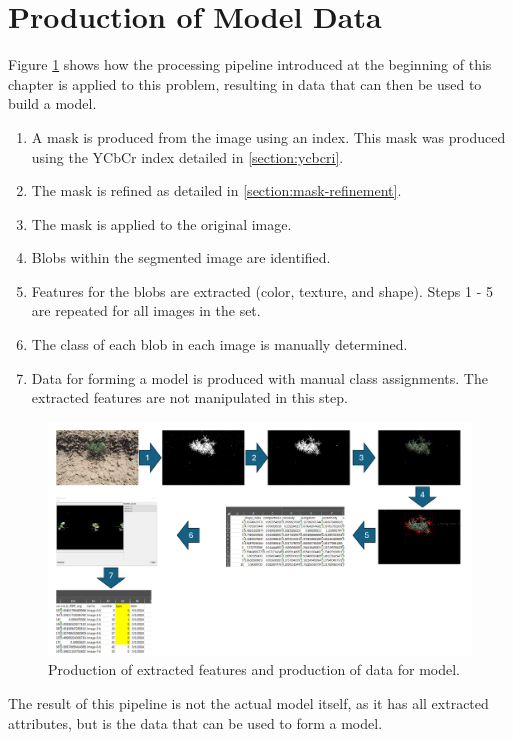 \documentclass[letterpaper, notitlepage]{report}
\begin{document}
\section{Production of Model Data}
Figure \ref{fig:workflow-for-model-data} shows how the processing pipeline introduced at the beginning of this chapter is applied to this problem, resulting in data that can then be used to build a model. 
\begin{enumerate}
	\item{A mask is produced from the image using an index. This mask was produced using the YCbCr index detailed in \ref{section:ycbcri}.}
	\item{The mask is refined as detailed in \ref{section:mask-refinement}.}
	\item{The mask is applied to the original image.}
	\item{Blobs within the segmented image are identified.}
	\item{Features for the blobs are extracted (color, texture, and shape). Steps 1 - 5 are repeated for all images in the set.}
	\item{The class of each blob in each image is manually determined.}
	\item{Data for forming a model is produced with manual class assignments. The extracted features are not manipulated in this step.}
\end{enumerate}

\begin{figure}[H]
	\centering
	\includegraphics[width=0.9\linewidth]{./figures/workflow-for-image.png}
	\caption[Production of extracted features]{Production of extracted features and production of data for model.}
	\label{fig:workflow-for-model-data}
\end{figure}

The result of this pipeline is not the actual model itself, as it has all extracted attributes, but is the data that can be used to form a model. 
\end{document}
